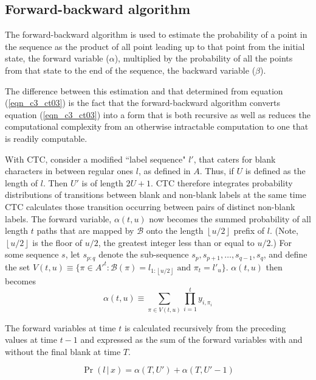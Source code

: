 \subsection{Forward-backward algorithm}

The forward-backward algorithm is used to estimate the probability of a point in the sequence as the product of all point leading up to that point from the  initial state, the forward variable ($\alpha$), multiplied by the probability of all the points from that state to the end of the sequence, the backward variable ($\beta$).

The difference between this estimation and that determined from equation (\ref{eqn_c3_ct03}) is the fact that the forward-backward algorithm converts equation (\ref{eqn_c3_ct03}) into a form that is both recursive as well as reduces the computational complexity from an otherwise intractable computation to one that is readily computable.

With CTC, consider a modified ``label sequence" $l'$, that caters for blank characters in between regular ones $l$, as defined in $A$. Thus, if $U$ is defined as the length of $l$.  Then $U'$ is of length $2U + 1$. CTC therefore integrates probability distributions of transitions between blank and non-blank labels at the same time CTC calculates those transition occurring between pairs of distinct non-blank labels.  The forward variable, $\alpha(t,u)$ now becomes the summed probability of all length $t$ paths that are mapped by $\mathcal{B}$ onto the length $\left \lfloor{u/2}\right \rfloor$ prefix of $l$. (Note, $\left \lfloor{u/2}\right \rfloor$ is the floor of $u/2$, the greatest integer less than or equal to $u/2$.) For some sequence $s$, let $s_{p:q}$ denote the sub-sequence $s_p, s_{p+1},\dots,s_{q-1},s_q$, and define the set $V(t,u) \equiv \{ \pi \in A'^t : \mathcal{B}(\pi) = l_{1:\left \lfloor{u/2}\right \rfloor} \text{ and } \pi_t = l'_u \}$.  $\alpha(t,u)$ then becomes
\begin{equation}
\alpha(t,u) \equiv \sum_{\pi \in V(t,u)} \prod_{i=1}^{t} y_{i,\pi_i} 
\label{eqn_c3_ctc04}
\end{equation}

The forward variables at time $t$ is calculated recursively from the preceding values at time $t - 1$ and expressed as the sum of the forward variables with and without the final blank at time $T$.

\begin{equation}
\Pr( l \, | \, x) = \alpha(T, U') + \alpha(T, U' - 1)
\label{eqn_c3_ctc05}
\end{equation}

